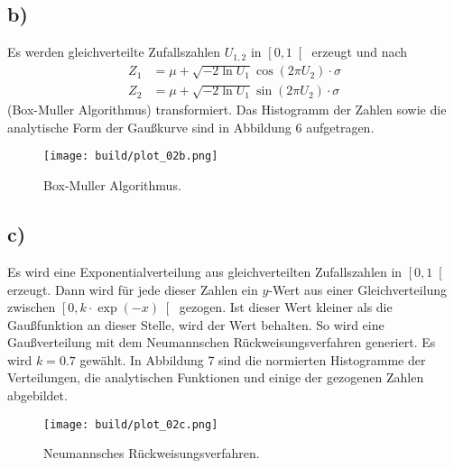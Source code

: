 \documentclass{scrartcl}
\begin{document}
\subsection*{b)}
Es werden gleichverteilte Zufallszahlen $U_{1,2}$ in $\left[0, 1\right[$ erzeugt und nach 
\begin{align*}
  Z_{1} &= \mu + {\sqrt {-2\ln U_{1}}}\cos(2\pi U_{2}) \cdot \sigma\\
  Z_{2} &= \mu + {\sqrt {-2\ln U_{1}}}\sin(2\pi U_{2}) \cdot \sigma
\end{align*}
(Box-Muller Algorithmus) transformiert.
Das Histogramm der Zahlen sowie die analytische Form der Gaußkurve sind in Abbildung 6 aufgetragen.
\begin{figure}[ht]
  \centering
  \texttt{[image: build/plot\_02b.png]}
  \caption{Box-Muller Algorithmus.}%
  \label{fig:6}
\end{figure}
\subsection*{c)}
Es wird eine Exponentialverteilung aus gleichverteilten Zufallszahlen in $\left[0, 1\right[$ erzeugt.
Dann wird für jede dieser Zahlen ein $y$-Wert aus einer Gleichverteilung zwischen $\left[0, k \cdot \exp(-x)\right[$ gezogen.
Ist dieser Wert kleiner als die Gaußfunktion an dieser Stelle, wird der Wert behalten.
So wird eine Gaußverteilung mit dem Neumannschen Rückweisungsverfahren generiert.
Es wird $k = 0.7$ gewählt.
In Abbildung 7 sind die normierten Histogramme der Verteilungen, die analytischen Funktionen und einige der gezogenen Zahlen abgebildet.
\begin{figure}[ht]
  \centering
  \texttt{[image: build/plot\_02c.png]}
  \caption{Neumannsches Rückweisungsverfahren.}%
  \label{fig:7}
\end{figure}
\end{document}
